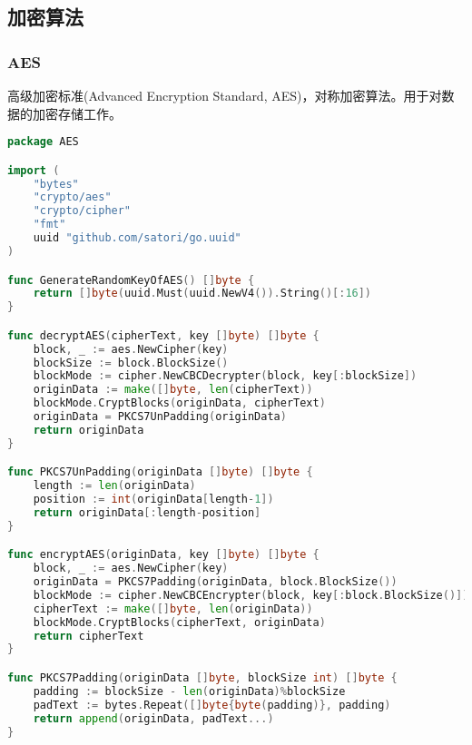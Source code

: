 \documentclass[UTF8]{ctexart}
\begin{document}
    \subsection{加密算法}
    \subsubsection{AES}
    \par
    高级加密标准(Advanced Encryption Standard, AES)，对称加密算法。用于对数据的加密存储工作。
    \begin{lstlisting}[language=Go]
package AES

import (
	"bytes"
	"crypto/aes"
	"crypto/cipher"
	"fmt"
	uuid "github.com/satori/go.uuid"
)

func GenerateRandomKeyOfAES() []byte {
	return []byte(uuid.Must(uuid.NewV4()).String()[:16])
}

func decryptAES(cipherText, key []byte) []byte {
	block, _ := aes.NewCipher(key)
	blockSize := block.BlockSize()
	blockMode := cipher.NewCBCDecrypter(block, key[:blockSize])
	originData := make([]byte, len(cipherText))
	blockMode.CryptBlocks(originData, cipherText)
	originData = PKCS7UnPadding(originData)
	return originData
}

func PKCS7UnPadding(originData []byte) []byte {
	length := len(originData)
	position := int(originData[length-1])
	return originData[:length-position]
}

func encryptAES(originData, key []byte) []byte {
	block, _ := aes.NewCipher(key)
	originData = PKCS7Padding(originData, block.BlockSize())
	blockMode := cipher.NewCBCEncrypter(block, key[:block.BlockSize()])
	cipherText := make([]byte, len(originData))
	blockMode.CryptBlocks(cipherText, originData)
	return cipherText
}

func PKCS7Padding(originData []byte, blockSize int) []byte {
	padding := blockSize - len(originData)%blockSize
	padText := bytes.Repeat([]byte{byte(padding)}, padding)
	return append(originData, padText...)
}
    \end{lstlisting}
\end{document}
